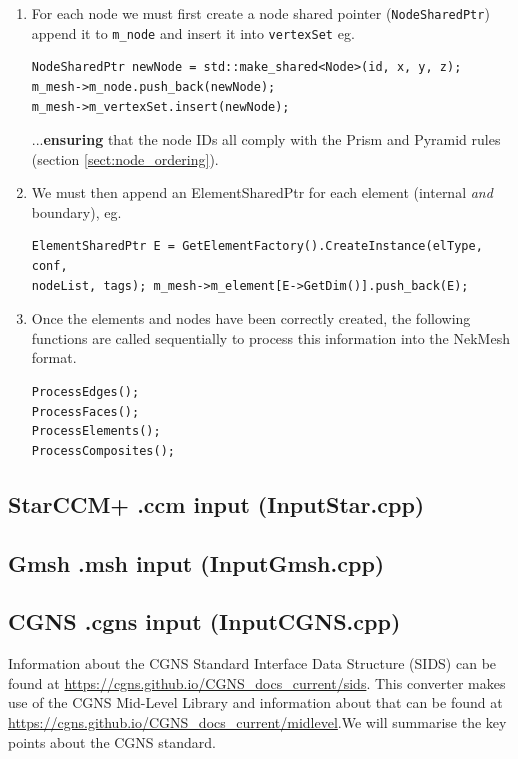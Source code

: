 {\begin{enumerate}
\item For each node we must first create a node shared pointer
  (\texttt{NodeSharedPtr}) append it to \texttt{m\_node} and insert it
  into \texttt{vertexSet} eg.\\
\begin{lstlisting}[style=BashInputStyle]
NodeSharedPtr newNode = std::make_shared<Node>(id, x, y, z);
m_mesh->m_node.push_back(newNode);
m_mesh->m_vertexSet.insert(newNode);
\end{lstlisting}
 
...\textbf{ensuring} that the node IDs all comply with the Prism and
Pyramid rules (section \ref{sect:node_ordering}).

\item We must then append an ElementSharedPtr for each element
  (internal \textit{and} boundary), eg.
\begin{lstlisting}[style=BashInputStyle]
ElementSharedPtr E = GetElementFactory().CreateInstance(elType, conf,
nodeList, tags); m_mesh->m_element[E->GetDim()].push_back(E);
\end{lstlisting}

\item Once the elements and nodes have been correctly created, the
  following functions are called sequentially to process this
  information into the NekMesh format.
\begin{lstlisting}[style=BashInputStyle]
ProcessEdges();
ProcessFaces(); 
ProcessElements(); 
ProcessComposites(); 
\end{lstlisting}
\end{enumerate}

\subsection{StarCCM+ .ccm input (InputStar.cpp)}

\subsection{Gmsh .msh input (InputGmsh.cpp)}

\subsection{CGNS .cgns input (InputCGNS.cpp)}
Information about the CGNS Standard Interface Data Structure (SIDS)
can be found at
\url{https://cgns.github.io/CGNS_docs_current/sids}. This converter
makes use of the CGNS Mid-Level Library and information about that can
be found at \url{https://cgns.github.io/CGNS_docs_current/midlevel}.We
will summarise the key points about the CGNS standard.\\

}
